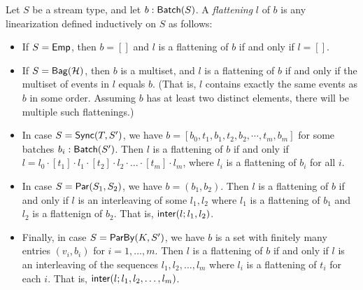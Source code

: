 \begin{definition}[Flattening]
    \label{def:batch-flattening}
    Let $S$ be a stream type,
    and let $b: \mathsf{Batch}({S})$.
    A \emph{flattening} $l$ of $b$ is any linearization
    defined inductively on $S$ as follows:
\begin{itemize}
\item If $S = \mathsf{Emp}{}$, then $b = []$ and $l$ is a flattening of $b$ if and only if $l = []$.
\item If $S = \mathsf{Bag}({\mathcal{H}})$, then $b$ is a multiset, and $l$ is a flattening of $b$ if and only if the multiset of events in $l$ equals $b$.
(That is, $l$ contains exactly the same events as $b$ in some order. Assuming $b$ has at least two distinct elements, there will be multiple such flattenings.)
\item In case $S = \mathsf{Sync}({T}, S')$, we have $b = [b_0, t_1, b_1, t_2, b_2, \cdots, t_m, b_m]$ for some batches $b_i: \mathsf{Batch}({S'})$.
Then $l$ is a flattening of $b$ if and only if $l = l_0 \cdot [t_1] \cdot l_1 \cdot [t_2] \cdot l_2 \cdot \ldots \cdot [t_m] \cdot l_m$,
where $l_i$ is a flattening of $b_i$ for all $i$.
\item In case $S = \mathsf{Par}({S_1}, {S_2})$, we have $b = (b_1, b_2)$.
Then $l$ is a flattening of $b$ if and only if $l$ is an interleaving of some $l_1, l_2$ where $l_1$ is a flattening of $b_1$ and $l_2$ is a flattenign of $b_2$.
That is, $\mathsf{inter}(l; l_1, l_2)$.
\item Finally, in case $S = \mathsf{ParBy}({K}, S')$, we have $b$ is a set with finitely many entries $(v_i, b_i)$ for $i = 1, \ldots, m$.
Then $l$ is a flattening of $b$ if and only if $l$ is an interleaving of the sequences $l_1, l_2, \ldots, l_m$
where $l_i$ is a flattening of $t_i$ for each $i$.
That is, $\mathsf{inter}(l; l_1, l_2, \ldots, l_m)$.
\end{itemize}
\end{definition}

